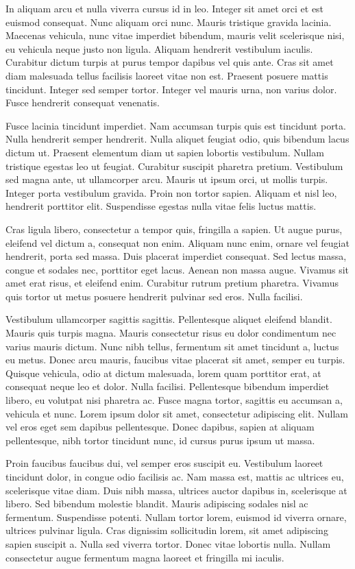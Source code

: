 \documentclass[a4paper]{article}
\begin{document}
In aliquam arcu et nulla viverra cursus id in leo. Integer sit amet orci et est euismod consequat. Nunc aliquam orci nunc. Mauris tristique gravida lacinia. Maecenas vehicula, nunc vitae imperdiet bibendum, mauris velit scelerisque nisi, eu vehicula neque justo non ligula. Aliquam hendrerit vestibulum iaculis. Curabitur dictum turpis at purus tempor dapibus vel quis ante. Cras sit amet diam malesuada tellus facilisis laoreet vitae non est. Praesent posuere mattis tincidunt. Integer sed semper tortor. Integer vel mauris urna, non varius dolor. Fusce hendrerit consequat venenatis.

Fusce lacinia tincidunt imperdiet. Nam accumsan turpis quis est tincidunt porta. Nulla hendrerit semper hendrerit. Nulla aliquet feugiat odio, quis bibendum lacus dictum ut. Praesent elementum diam ut sapien lobortis vestibulum. Nullam tristique egestas leo ut feugiat. Curabitur suscipit pharetra pretium. Vestibulum sed magna ante, ut ullamcorper arcu. Mauris ut ipsum orci, ut mollis turpis. Integer porta vestibulum gravida. Proin non tortor sapien. Aliquam et nisl leo, hendrerit porttitor elit. Suspendisse egestas nulla vitae felis luctus mattis.

Cras ligula libero, consectetur a tempor quis, fringilla a sapien. Ut augue purus, eleifend vel dictum a, consequat non enim. Aliquam nunc enim, ornare vel feugiat hendrerit, porta sed massa. Duis placerat imperdiet consequat. Sed lectus massa, congue et sodales nec, porttitor eget lacus. Aenean non massa augue. Vivamus sit amet erat risus, et eleifend enim. Curabitur rutrum pretium pharetra. Vivamus quis tortor ut metus posuere hendrerit pulvinar sed eros. Nulla facilisi.

Vestibulum ullamcorper sagittis sagittis. Pellentesque aliquet eleifend blandit. Mauris quis turpis magna. Mauris consectetur risus eu dolor condimentum nec varius mauris dictum. Nunc nibh tellus, fermentum sit amet tincidunt a, luctus eu metus. Donec arcu mauris, faucibus vitae placerat sit amet, semper eu turpis. Quisque vehicula, odio at dictum malesuada, lorem quam porttitor erat, at consequat neque leo et dolor. Nulla facilisi. Pellentesque bibendum imperdiet libero, eu volutpat nisi pharetra ac. Fusce magna tortor, sagittis eu accumsan a, vehicula et nunc. Lorem ipsum dolor sit amet, consectetur adipiscing elit. Nullam vel eros eget sem dapibus pellentesque. Donec dapibus, sapien at aliquam pellentesque, nibh tortor tincidunt nunc, id cursus purus ipsum ut massa.

Proin faucibus faucibus dui, vel semper eros suscipit eu. Vestibulum laoreet tincidunt dolor, in congue odio facilisis ac. Nam massa est, mattis ac ultrices eu, scelerisque vitae diam. Duis nibh massa, ultrices auctor dapibus in, scelerisque at libero. Sed bibendum molestie blandit. Mauris adipiscing sodales nisl ac fermentum. Suspendisse potenti. Nullam tortor lorem, euismod id viverra ornare, ultrices pulvinar ligula. Cras dignissim sollicitudin lorem, sit amet adipiscing sapien suscipit a. Nulla sed viverra tortor. Donec vitae lobortis nulla. Nullam consectetur augue fermentum magna laoreet et fringilla mi iaculis.
\end{document}

